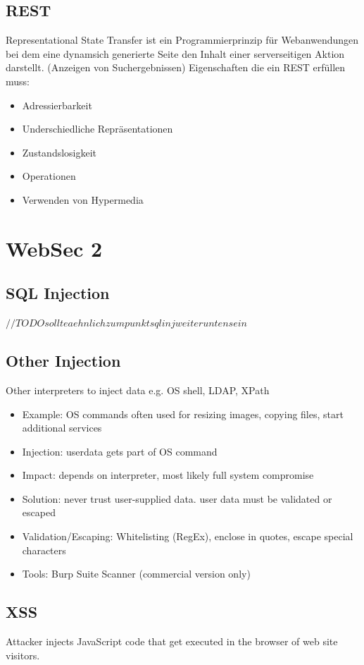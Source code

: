 \documentclass[a4paper, 12pt]{article}
\begin{document}
\subsection{REST}
Representational State Transfer ist ein Programmierprinzip für Webanwendungen bei dem eine dynamsich generierte Seite den Inhalt einer serverseitigen Aktion darstellt. (Anzeigen von Suchergebnissen)
\large Eigenschaften die ein REST erfüllen muss:
\begin{itemize}
	\item Adressierbarkeit
	\item Underschiedliche Repräsentationen
	\item Zustandslosigkeit
	\item Operationen
	\item Verwenden von Hypermedia
\end{itemize}

\section{WebSec 2}
\subsection{SQL Injection}
$ //TODO sollte aehnlich zum punkt sql inj weiter unten sein $
\subsection{Other Injection}
Other interpreters to inject data e.g. OS shell, LDAP, XPath \\
\begin{itemize}
\item Example: OS commands often used for resizing images, copying files, start additional services
\item Injection: userdata gets part of OS command
\item Impact: depends on interpreter, most likely full system compromise
\item Solution: never trust user-supplied data. user data must be validated or escaped
\item Validation/Escaping: Whitelisting (RegEx), enclose in quotes, escape special characters
\item Tools: Burp Suite Scanner (commercial version only)
\end{itemize}

\subsection{XSS}
Attacker injects JavaScript code that get executed in the browser of web site visitors.\\
\end{document}
